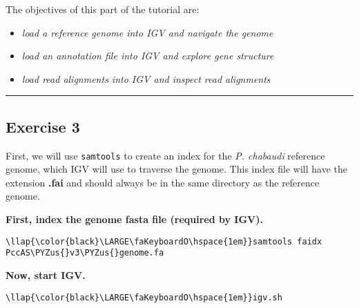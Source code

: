 \documentclass[11pt]{article}
\providecommand{\tightlist}{%
      \setlength{\itemsep}{0pt}\setlength{\parskip}{0pt}}
\def\PYZus{\char`\_}
\begin{document}
The objectives of this part of the tutorial are:

\begin{itemize}
\tightlist
\item
  \textit{load a reference genome into IGV and navigate the genome}
\item
  \textit{load an annotation file into IGV and explore gene structure}
\item
  \textit{load read alignments into IGV and inspect read alignments}
\end{itemize}

    \begin{center}\rule{0.5\linewidth}{.4pt}\end{center}

    \hypertarget{exercise-3}{%
\subsection{Exercise 3}\label{exercise-3}}

First, we will use \texttt{samtools} to create an index for the \textit{P.
chabaudi} reference genome, which IGV will use to traverse the genome.
This index file will have the extension \textbf{.fai} and should always
be in the same directory as the reference genome.

    \textbf{First, index the genome fasta file (required by IGV).}





\begin{terminalinput}
\begin{Verbatim}[commandchars=\\\{\}]
\llap{\color{black}\LARGE\faKeyboardO\hspace{1em}}samtools faidx PccAS\PYZus{}v3\PYZus{}genome.fa
\end{Verbatim}
\end{terminalinput}



    \textbf{Now, start IGV.}





\begin{terminalinput}
\begin{Verbatim}[commandchars=\\\{\}]
\llap{\color{black}\LARGE\faKeyboardO\hspace{1em}}igv.sh
\end{Verbatim}
\end{terminalinput}
\end{document}
